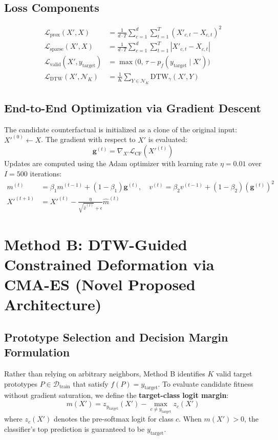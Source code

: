 \documentclass[11pt,a4paper]{report}
\begin{document}
\subsection{Loss Components}
\begin{align}
    \mathcal{L}_{\text{prox}}(X', X) &= \frac{1}{d \cdot T} \sum_{c=1}^d \sum_{t=1}^T (X'_{c,t} - X_{c,t})^2 \\
    \mathcal{L}_{\text{sparse}}(X', X) &= \frac{1}{d \cdot T} \sum_{c=1}^d \sum_{t=1}^T |X'_{c,t} - X_{c,t}| \\
    \mathcal{L}_{\text{valid}}(X', y_{\text{target}}) &= \max\Big(0, \, \tau - p_f(y_{\text{target}} \mid X')\Big) \\
    \mathcal{L}_{\text{DTW}}(X', \mathcal{N}_K) &= \frac{1}{K} \sum_{Y \in \mathcal{N}_K} \text{DTW}_\gamma(X', Y)
\end{align}

\subsection{End-to-End Optimization via Gradient Descent}
The candidate counterfactual is initialized as a clone of the original input: $X'^{(0)} \leftarrow X$. The gradient with respect to $X'$ is evaluated:
\begin{equation}
    \mathbf{g}^{(t)} = \nabla_{X'} \mathcal{L}_{\text{CF}}(X'^{(t)})
\end{equation}
Updates are computed using the Adam optimizer with learning rate $\eta = 0.01$ over $I = 500$ iterations:
\begin{align}
    m^{(t)} &= \beta_1 m^{(t-1)} + (1-\beta_1) \mathbf{g}^{(t)}, \quad v^{(t)} = \beta_2 v^{(t-1)} + (1-\beta_2) (\mathbf{g}^{(t)})^2 \\
    X'^{(t+1)} &= X'^{(t)} - \frac{\eta}{\sqrt{\hat{v}^{(t)}} + \epsilon} \hat{m}^{(t)}
\end{align}

\section{Method B: DTW-Guided Constrained Deformation via CMA-ES (Novel Proposed Architecture)}

\subsection{Prototype Selection and Decision Margin Formulation}
Rather than relying on arbitrary neighbors, Method B identifies $K$ valid target prototypes $P \in \mathcal{D}_{\text{train}}$ that satisfy $f(P) = y_{\text{target}}$. To evaluate candidate fitness without gradient saturation, we define the \textbf{target-class logit margin}:
\begin{equation}
    m(X') = z_{y_{\text{target}}}(X') - \max_{c \neq y_{\text{target}}} z_c(X')
\end{equation}
where $z_c(X')$ denotes the pre-softmax logit for class $c$. When $m(X') > 0$, the classifier's top prediction is guaranteed to be $y_{\text{target}}$.
\end{document}
